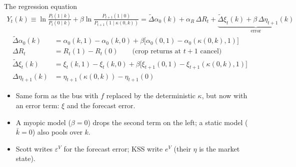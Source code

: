 \documentclass[aspectratio=169,11pt]{beamer}
\begin{document}
\begin{frame}{The regression equation}
\small
\vspace{-0.5em}
\begin{align*}
Y_t(k) \equiv \ln\frac{P_t(1 \mid k)}{P_t(0 \mid k)} + \beta \ln \frac{P_{t+1}(1 \mid 0)}{P_{t+1}(1 \mid \kappa(0,k))} = \tilde\Delta\alpha_0(k) + \alpha_R\, \Delta R_t + \underbrace{\tilde\Delta\xi_t(k) + \beta\, \Delta\eta_{t+1}(k)}_{\text{error}}
\end{align*}
\vspace{-1em}
\begin{align*}
\tilde\Delta\alpha_0(k) &= \alpha_0(k,1) - \alpha_0(k,0) + \beta\big[\alpha_0(0,1) - \alpha_0(\kappa(0,k),1)\big]\\
\Delta R_t &= R_t(1) - R_t(0) \qquad \text{(crop returns at $t+1$ cancel)}\\
\tilde\Delta\xi_t(k) &= \xi_t(k,1) - \xi_t(k,0) + \beta\big[\xi_{t+1}(0,1) - \xi_{t+1}(\kappa(0,k),1)\big]\\
\Delta\eta_{t+1}(k) &= \eta_{t+1}(\kappa(0,k)) - \eta_{t+1}(0)
\end{align*}
\begin{itemize}
\item Same form as the bus with $f$ replaced by the deterministic $\kappa$, but now with an error term: $\xi$ and the forecast error.
\item A \alert{myopic} model ($\beta = 0$) drops the second term on the left; a \alert{static} model ($\bar k = 0$) also pools over $k$.
\item Scott writes $\varepsilon^V$ for the forecast error; KSS write $e^V$ (their $\eta$ is the market state).
\end{itemize}
\end{frame}
\end{document}
